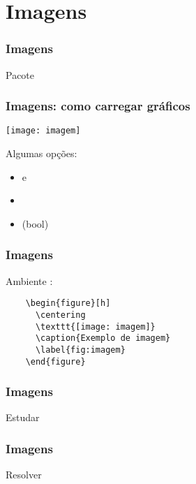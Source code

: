 \section{Imagens}

\begin{frame}
  \frametitle{Imagens}
  \LARGE
  Pacote 
\end{frame}

\begin{frame}[fragile]
  \frametitle{Imagens: como carregar gráficos}
  \Large
  \texttt{\texttt{[image: imagem]}}
  \vspace{1em}

  Algumas opções:
  \begin{itemize}
    \item {} e 
    \item {}
    \item {} (bool)
  \end{itemize}
\end{frame}

\begin{frame}[fragile]
  \frametitle{Imagens}
  \Large
  Ambiente :

    \begin{verbatim}
    \begin{figure}[h]
      \centering
      \texttt{[image: imagem]}
      \caption{Exemplo de imagem}
      \label{fig:imagem}
    \end{figure}
    \end{verbatim}
\end{frame}

\begin{frame}
  \frametitle{Imagens}
  \Huge
  Estudar 
\end{frame}

\begin{frame}
  \frametitle{Imagens}
  \Huge
  Resolver 
\end{frame}
